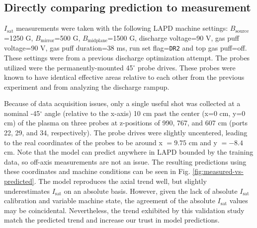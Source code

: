 \subsection{Directly comparing prediction to measurement}


$I_\text{sat}$ measurements were taken with the following LAPD machine settings: $B_\text{source}$=1250 G, $B_\text{mirror}$=500 G, $B_\text{midplane}$=1500 G, discharge voltage=90 V, gas puff voltage=90 V, gas puff duration=38 ms, run set flag=\texttt{DR2} and top gas puff=off. These settings were from a previous discharge optimization attempt. The probes utilized were the permanently-mounted 45$^\circ$ probe drives. These probes were known to have identical effective areas relative to each other from the previous experiment and from analyzing the discharge rampup.

Because of data acquisition issues, only a single useful shot was collected at a nominal -45$^\circ$ angle (relative to the x-axis) 10 cm past the center (x=0 cm, y=0 cm) of the plasma on three probes at z-positions of 990, 767, and 607 cm (ports 22, 29, and 34, respectively). The probe drives were slightly uncentered, leading to the real coordinates of the probes to be around x $=9.75$ cm and y $=-8.4$ cm. Note that the model can predict anywhere in LAPD bounded by the training data, so off-axis measurements are not an issue.
The resulting predictions using these coordinates and machine conditions can be seen in Fig. \ref{fig:measured-vs-predicted}. 
The model reproduces the axial trend well, but slightly underestimates $I_\text{sat}$ on an absolute basis. However, given the lack of absolute $I_\text{sat}$ calibration and variable machine state, the agreement of the absolute $I_\text{sat}$ values may be coincidental. Nevertheless, the trend exhibited by this validation study match the predicted trend and increase our trust in model predictions. 

